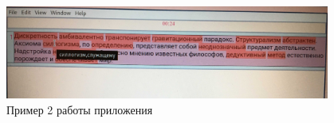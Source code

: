 \begin{figure}[H]
  \centering
  \includegraphics[width=0.95\textwidth]{TexModules/pics/primer2.jpg}
  \caption{Пример 2 работы приложения}
  \label{img:primer2}
\end{figure}
